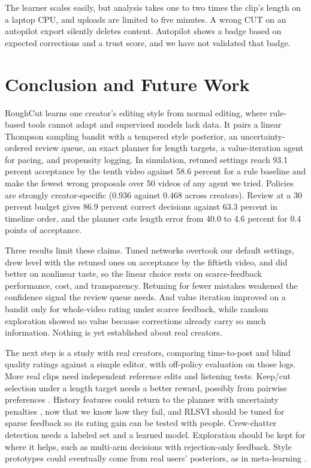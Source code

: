 \documentclass{ieeeaccess}
\begin{document}
The learner scales easily, but analysis takes one to two times the clip's length on a laptop CPU, and uploads are limited to five minutes. A wrong CUT on an autopilot export silently deletes content. Autopilot shows a badge based on expected corrections and a trust score, and we have not validated that badge.

\section{Conclusion and Future Work}
\label{sec:conclusion}
RoughCut learns one creator's editing style from normal editing, where rule-based tools cannot adapt and supervised models lack data. It pairs a linear Thompson sampling bandit with a tempered style posterior, an uncertainty-ordered review queue, an exact planner for length targets, a value-iteration agent for pacing, and propensity logging. In simulation, retuned settings reach 93.1 percent acceptance by the tenth video against 58.6 percent for a rule baseline and make the fewest wrong proposals over 50 videos of any agent we tried. Policies are strongly creator-specific (0.936 against 0.468 across creators). Review at a 30 percent budget gives 86.9 percent correct decisions against 63.3 percent in timeline order, and the planner cuts length error from 40.0 to 4.6 percent for 0.4 points of acceptance.

Three results limit these claims. Tuned networks overtook our default settings, drew level with the retuned ones on acceptance by the fiftieth video, and did better on nonlinear taste, so the linear choice rests on scarce-feedback performance, cost, and transparency. Retuning for fewer mistakes weakened the confidence signal the review queue needs. And value iteration improved on a bandit only for whole-video rating under scarce feedback, while random exploration showed no value because corrections already carry so much information. Nothing is yet established about real creators.

The next step is a study with real creators, comparing time-to-post and blind quality ratings against a simple editor, with off-policy evaluation on those logs. More real clips need independent reference edits and listening tests. Keep/cut selection under a length target needs a better reward, possibly from pairwise preferences \cite{christiano2017}. History features could return to the planner with uncertainty penalties \cite{yu2020}, now that we know how they fail, and RLSVI should be tuned for sparse feedback so its rating gain can be tested with people. Crew-chatter detection needs a labeled set and a learned model. Exploration should be kept for where it helps, such as multi-arm decisions with rejection-only feedback. Style prototypes could eventually come from real users' posteriors, as in meta-learning \cite{kveton2021meta,cella2020meta}.
\end{document}
